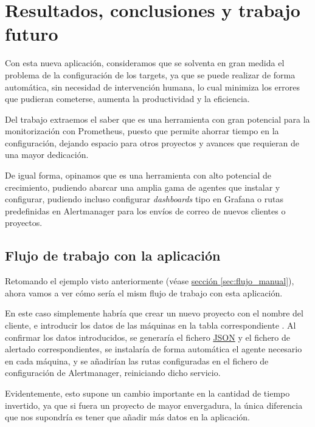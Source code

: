 \chapter{Resultados, conclusiones y trabajo futuro}

Con esta nueva aplicación, consideramos que se solventa en gran medida el problema de la configuración de los targets, ya que se puede realizar de forma automática, sin necesidad de intervención humana, lo cual minimiza los errores que pudieran cometerse, aumenta la productividad y la eficiencia.

Del trabajo extraemos el saber que es una herramienta con gran potencial para la monitorización con Prometheus, puesto que permite ahorrar tiempo en la configuración, dejando espacio para otros proyectos y avances que requieran de una mayor dedicación.

De igual forma, opinamos que es una herramienta con alto potencial de crecimiento, pudiendo abarcar una amplia gama de agentes que instalar y configurar, pudiendo incluso configurar \textit{dashboards} tipo en Grafana o rutas predefinidas en Alertmanager para los envíos de correo de nuevos clientes o proyectos.

\section*{Flujo de trabajo con la aplicación}

Retomando el ejemplo visto anteriormente (véase \hyperref[sec:flujo_manual]{sección \ref{sec:flujo_manual}}), ahora vamos a ver cómo sería el mism flujo de trabajo con esta aplicación.

En este caso simplemente habría que crear un nuevo proyecto con el nombre del cliente, e introducir los datos de las máquinas en la tabla correspondiente . Al confirmar los datos introducidos, se generaría el fichero \url{JSON} y el fichero de alertado correspondientes, se instalaría de forma automática el agente necesario en cada máquina, y se añadirían las rutas configuradas en el fichero de configuración de Alertmanager, reiniciando dicho servicio.

Evidentemente, esto supone un cambio importante en la cantidad de tiempo invertido, ya que si fuera un proyecto de mayor envergadura, la única diferencia que nos supondría es tener que añadir más datos en la aplicación.